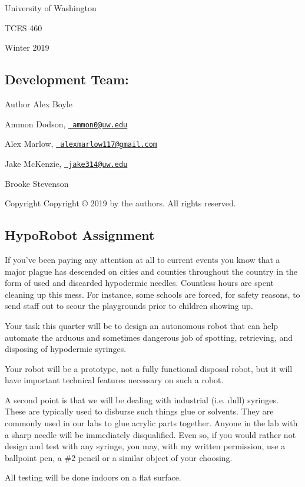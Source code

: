University of Washington

T\+C\+ES 460

Winter 2019\hypertarget{index_autotoc_md1}{}\subsection{Development Team\+:}\label{index_autotoc_md1}
\begin{DoxyAuthor}{Author}
Alex Boyle 

Ammon Dodson, \href{mailto:ammon0@uw.edu}{\texttt{ ammon0@uw.\+edu}} 

Alex Marlow, \href{mailto:alexmarlow117@gmail.com}{\texttt{ alexmarlow117@gmail.\+com}} 

Jake Mc\+Kenzie, \href{mailto:jake314@uw.edu}{\texttt{ jake314@uw.\+edu}} 

Brooke Stevenson
\end{DoxyAuthor}
\begin{DoxyCopyright}{Copyright}
Copyright \copyright{} 2019 by the authors. All rights reserved.
\end{DoxyCopyright}
\hypertarget{index_autotoc_md2}{}\subsection{Hypo\+Robot Assignment}\label{index_autotoc_md2}
If you’ve been paying any attention at all to current events you know that a major plague has descended on cities and counties throughout the country in the form of used and discarded hypodermic needles. Countless hours are spent cleaning up this mess. For instance, some schools are forced, for safety reasons, to send staff out to scour the playgrounds prior to children showing up.

Your task this quarter will be to design an autonomous robot that can help automate the arduous and sometimes dangerous job of spotting, retrieving, and disposing of hypodermic syringes.

Your robot will be a prototype, not a fully functional disposal robot, but it will have important technical features necessary on such a robot.

A second point is that we will be dealing with industrial (i.\+e. dull) syringes. These are typically used to disburse such things glue or solvents. They are commonly used in our labs to glue acrylic parts together. Anyone in the lab with a sharp needle will be immediately disqualified. Even so, if you would rather not design and test with any syringe, you may, with my written permission, use a ballpoint pen, a \#2 pencil or a similar object of your choosing.

All testing will be done indoors on a flat surface. 